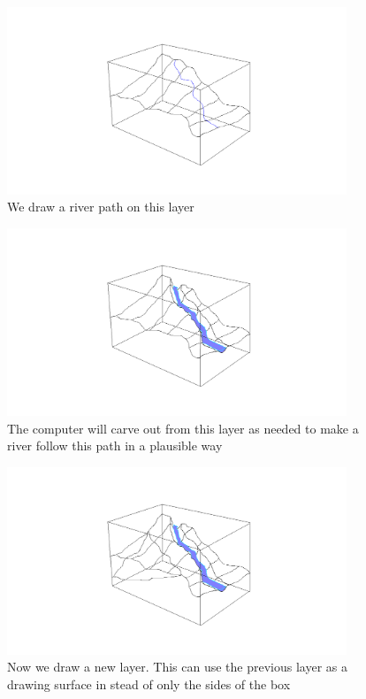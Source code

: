 \documentclass[12pt,a4paper]{article}
\begin{document}
\begin{figure}
\centering
\includegraphics[width=4in]{drawRiver}
\caption[]{
  \footnotesize
  We draw a river path on this layer
  \label{fig:drawRiver}
}
\end{figure}

\begin{figure}
\centering
\includegraphics[width=4in]{carveRiver}
\caption[]{
  \footnotesize
  The computer will carve out from this layer as needed to make a river follow this path in a plausible way
  \label{fig:carveRiver}
}
\end{figure}

\begin{figure}
\centering
\includegraphics[width=4in]{drawNewLayer}
\caption[]{
  \footnotesize
  Now we draw a new layer. This can use the previous layer as a drawing surface in stead of only the sides of the box
  \label{fig:drawNewLayer}
}
\end{figure}
\end{document}
